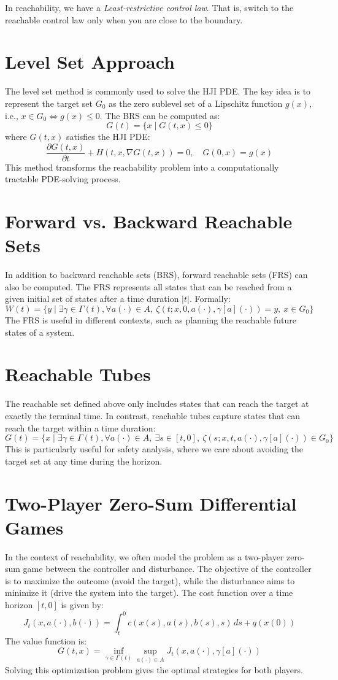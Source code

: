 \documentclass{article}
\begin{document}
In reachability, we have a \textit{Least-restrictive control law}. That is, switch to the reachable control law only when you are close to the boundary. 

\section{Level Set Approach}
The level set method is commonly used to solve the HJI PDE. The key idea is to represent the target set \(G_0\) as the zero sublevel set of a Lipschitz function \(g(x)\), i.e., \(x \in G_0 \iff g(x) \leq 0\). The BRS can be computed as:
\[
G(t) = \{ x \mid G(t, x) \leq 0 \}
\]
where \(G(t,x)\) satisfies the HJI PDE:
\[
\frac{\partial G(t,x)}{\partial t} + H(t,x, \nabla G(t,x)) = 0, \quad G(0,x) = g(x)
\]
This method transforms the reachability problem into a computationally tractable PDE-solving process.

\section{Forward vs. Backward Reachable Sets}
In addition to backward reachable sets (BRS), forward reachable sets (FRS) can also be computed. The FRS represents all states that can be reached from a given initial set of states after a time duration \(|t|\). Formally:
\[
W(t) = \{ y \mid \exists \gamma \in \Gamma(t), \forall a(\cdot) \in A, \ \zeta(t; x, 0, a(\cdot), \gamma[a](\cdot)) = y, \ x \in G_0 \}
\]
The FRS is useful in different contexts, such as planning the reachable future states of a system.

\section{Reachable Tubes}
The reachable set defined above only includes states that can reach the target at exactly the terminal time. In contrast, reachable tubes capture states that can reach the target within a time duration:
\[
G(t) = \{ x \mid \exists \gamma \in \Gamma(t), \forall a(\cdot) \in A, \ \exists s \in [t,0], \ \zeta(s;x,t,a(\cdot),\gamma[a](\cdot)) \in G_0 \}
\]
This is particularly useful for safety analysis, where we care about avoiding the target set at any time during the horizon.

\section{Two-Player Zero-Sum Differential Games}
In the context of reachability, we often model the problem as a two-player zero-sum game between the controller and disturbance. The objective of the controller is to maximize the outcome (avoid the target), while the disturbance aims to minimize it (drive the system into the target). The cost function over a time horizon \([t,0]\) is given by:
\[
J_t(x, a(\cdot), b(\cdot)) = \int_t^0 c(x(s), a(s), b(s), s) \, ds + q(x(0))
\]
The value function is:
\[
G(t,x) = \inf_{\gamma \in \Gamma(t)} \sup_{a(\cdot) \in A} J_t(x, a(\cdot), \gamma[a](\cdot))
\]
Solving this optimization problem gives the optimal strategies for both players.
\end{document}
